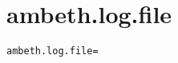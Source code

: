 \section{ambeth.log.file}
\label{configuration:AmbethLogFile}
\ClearAPI
\TODO
{}
\begin{lstlisting}[style=Props,caption={Usage example for \textit{ambeth.log.file}}]
ambeth.log.file=
\end{lstlisting}